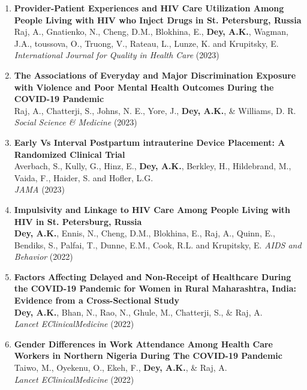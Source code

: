 \documentclass[11pt,letterpaper]{article}
\begin{document}
\begin{enumerate}
\item \textbf{Provider-Patient Experiences and HIV Care Utilization Among People Living with HIV who Inject Drugs in St. Petersburg, Russia}\\
Raj, A., Gnatienko, N., Cheng, D.M., Blokhina, E., \textbf{Dey, A.K.}, Wagman, J.A., toussova, O., Truong, V., Rateau, L., Lunze, K. and Krupitsky, E.\\
\emph{International Journal for Quality in Health Care} (2023) 

\item \textbf{The Associations of Everyday and Major Discrimination Exposure with Violence and Poor Mental Health Outcomes During the COVID-19 Pandemic}\\
Raj, A., Chatterji, S., Johns, N. E., Yore, J., \textbf{Dey, A.K.}, \& Williams, D. R.\\
\emph{Social Science \& Medicine} (2023) 

\item \textbf{Early Vs Interval Postpartum intrauterine Device Placement: A Randomized Clinical Trial}\\
Averbach, S., Kully, G., Hinz, E., \textbf{Dey, A.K.}, Berkley, H., Hildebrand, M., Vaida, F., Haider, S. and Hofler, L.G.\\
\emph{JAMA} (2023) 

\item \textbf{Impulsivity and Linkage to HIV Care Among People Living with HIV in St. Petersburg, Russia}\\
\textbf{Dey, A.K.}, Ennis, N., Cheng, D.M., Blokhina, E., Raj, A., Quinn, E., Bendiks, S., Palfai, T., Dunne, E.M., Cook, R.L. and Krupitsky, E.
\emph{AIDS and Behavior} (2022)  

\item \textbf{Factors Affecting Delayed and Non-Receipt of Healthcare During the COVID-19 Pandemic for Women in Rural Maharashtra, India: Evidence from a Cross-Sectional Study}\\
\textbf{Dey, A.K.}, Bhan, N., Rao, N., Ghule, M., Chatterji, S., \& Raj, A.\\
\emph{Lancet EClinicalMedicine} (2022) 

\item \textbf{Gender Differences in Work Attendance Among Health Care Workers in Northern Nigeria During The COVID-19 Pandemic}\\
Taiwo, M., Oyekenu, O., Ekeh, F., \textbf{Dey, A.K.}, \& Raj, A.\\
\emph{Lancet EClinicalMedicine} (2022) 


\end{enumerate}
\end{document}
